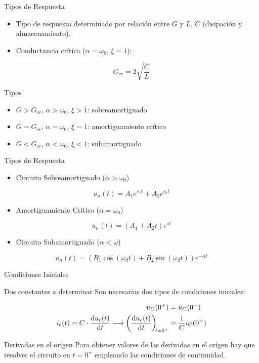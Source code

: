 \documentclass[aspectratio=169, usenames,svgnames,dvipsnames]{beamer}
\begin{document}
\begin{frame}[label={sec:orge96c961}]{Tipos de Respuesta}
\begin{itemize}
\item Tipo de respuesta determinado por relación entre \(G\) y \(L\), \(C\) (disipación y almacenamiento).
\item Conductancia crítica (\(\alpha = \omega_0\), \(\xi = 1\)):
\end{itemize}

\[
  G_{cr} = 2\sqrt{\frac{C}{L}}
\]

\begin{block}{Tipos}
\begin{itemize}
\item \(G > G_{cr}\), \(\alpha > \omega_0\), \(\xi > 1\): \alert{sobreamortiguado}
\item \(G = G_{cr}\),  \(\alpha = \omega_0\), \(\xi = 1\): \alert{amortiguamiento crítico}
\item \(G < G_{cr}\),  \(\alpha < \omega_0\), \(\xi < 1\): \alert{subamortiguado}
\end{itemize}
\end{block}
\end{frame}

\begin{frame}[label={sec:org2962f1d}]{Tipos de Respuesta}
\begin{itemize}
\item Circuito Sobreamortiguado (\(\alpha > \omega_0\))
\end{itemize}
\[
  \boxed{u_n(t) = A_1 e^{s_1 t} + A_2 e^{s_2 t}}
\]
\begin{itemize}
\item Amortiguamiento Crítico (\(\alpha = \omega_0\))
\end{itemize}
\[
  \boxed{u_n(t) = (A_1 + A_2 t) e^{s t} }
\]

\begin{itemize}
\item Circuito Subamortiguado (\(\alpha < \omega\))
\end{itemize}
\[
  \boxed{u_n(t) = (B_1\cos(\omega_d t) + B_2\sin(\omega_d t)) e^{-\alpha t}}
\]
\end{frame}


\begin{frame}[label={sec:org302833a}]{Condiciones Iniciales}
\begin{block}{Dos constantes a determinar}
Son necesarias dos tipos de condiciones iniciales:


\begin{align*}
  u_C(0^+) &= u_C(0^-)\\
  i_c(t) = C \cdot \diff{u_c(t)}{t} \longrightarrow \diff{u_c(t)}{t}[t = 0^+] &= \frac{1}{C}i_C(0^+)
\end{align*}
\end{block}

\begin{block}{Derivadas en el origen}
Para obtener valores de las derivadas en el origen hay que resolver el circuito en \(t = 0^+\) empleando las condiciones de continuidad.
\end{block}
\end{frame}
\end{document}
